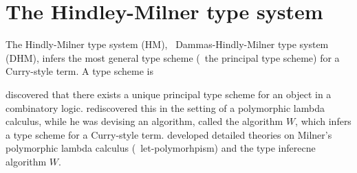 \section{The Hindley-Milner type system} \label{sec:hm}

The Hindly-Milner type system (HM),
\aka\ Dammas-Hindly-Milner type system (DHM),
\cite{Hindley69,Milner78,DamMil82,Damas85} infers the most general type scheme
(\aka\ the principal type scheme) for a Curry-style term.
A type scheme is

\citet{Hindley69} discovered that there exists a unique principal type scheme
for an object in a combinatory logic. \citet{Milner78} rediscovered this
in the setting of a polymorphic lambda calculus, while he was devising
an algorithm, called the algorithm $W$, which infers a type scheme for
a Curry-style term. \citet{Damas85} developed detailed theories on
Milner's polymorphic lambda calculus (\aka\ let-polymorhpism) and
the type inferecne algorithm $W$.


